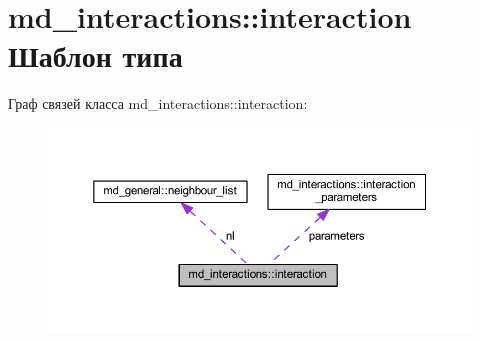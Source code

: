 \hypertarget{structmd__interactions_1_1interaction}{}\section{md\+\_\+interactions\+:\+:interaction Шаблон типа}
\label{structmd__interactions_1_1interaction}


Граф связей класса md\+\_\+interactions\+:\+:interaction\+:\nopagebreak
\begin{figure}[H]
\begin{center}
\leavevmode
\includegraphics[width=350pt]{structmd__interactions_1_1interaction__coll__graph}
\end{center}
\end{figure}
